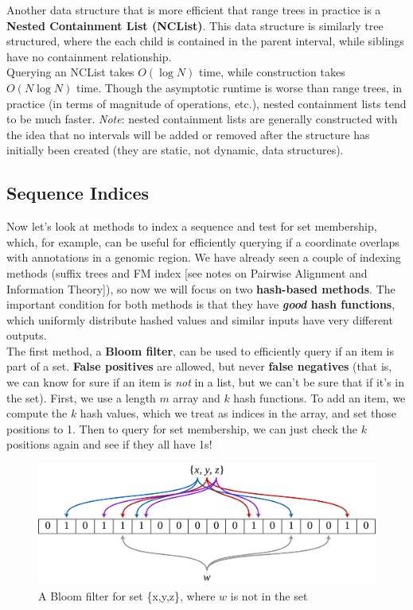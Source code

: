 \documentclass[12pt]{article}
\begin{document}
Another data structure that is more efficient that range trees in practice is a \textbf{Nested Containment List (NCList)}. This data structure is similarly tree structured, where the each child is contained in the parent interval, while siblings have no containment relationship.\\[10pt]
Querying an NCList takes $O(\log N)$ time, while construction takes $O(N\log N)$ time. Though the asymptotic runtime is worse than range trees, in practice (in terms of magnitude of operations, etc.), nested containment lists tend to be much faster. \textit{Note}: nested containment lists are generally constructed with the idea that no intervals will be added or removed after the structure has initially been created (they are static, not dynamic, data structures).
\subsection{Sequence Indices}
Now let's look at methods to index a sequence and test for set membership, which, for example, can be useful for efficiently querying if a coordinate overlaps with annotations in a genomic region. We have already seen a couple of indexing methods (suffix trees and FM index [see notes on Pairwise Alignment and Information Theory]), so now we will focus on two \textbf{hash-based methods}. The important condition for both methods is that they have \textbf{\textit{good} hash functions}, which uniformly distribute hashed values and similar inputs have very different outputs. \\[10pt]
The first method, a \textbf{Bloom filter}, can be used to efficiently query if an item is part of a set. \textbf{False positives} are allowed, but never \textbf{false negatives} (that is, we can know for sure if an item is \textit{not} in a list, but we can't be sure that if it's in the set). First, we use a length $m$ array and $k$ hash functions. To add an item, we compute the $k$ hash values, which we treat as indices in the array, and set those positions to 1. Then to query for set membership, we can just check the $k$ positions again and see if they all have 1s!\\[10pt]
\begin{figure}[t]
    \centering
    \includegraphics[width=.7\linewidth]{1920px-Bloom_filter.svg.png}
    \caption{A Bloom filter for set \{x,y,z\}, where $w$ is not in the set}
    \label{fig:my_label}
\end{figure}
\end{document}
